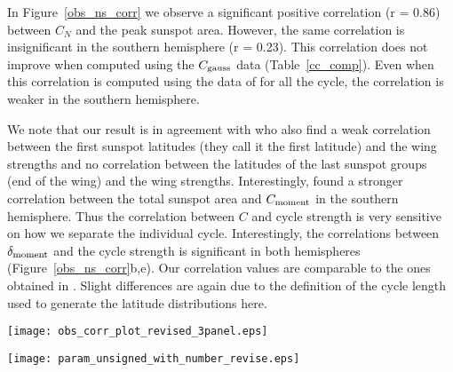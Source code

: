 \documentclass[preprint2,times,tighten]{aastex61}
\newcommand{\Fig}[1]{Figure~\ref{#1}}
\begin{document}
In \Fig{obs_ns_corr} we observe a significant positive correlation (r = 0.86) 
between $C_N$ and the peak sunspot area. However, the same correlation is insignificant 
in the southern hemisphere (r = 0.23). This correlation does not improve when computed using the $C_{\rm{ gauss}}$ data (Table~\ref{cc_comp}).
Even when this correlation is computed using the data of \citet{2017A&A...599A.131L} for all the cycle, the correlation is weaker in the southern hemisphere.

We note that our result is in agreement with \cite{2017A&A...599A.131L} who also find a weak correlation 
between the first sunspot latitudes (they call it the first latitude) and the wing strengths and no correlation between the latitudes of the last sunspot groups (end of the wing) and the wing strengths.
Interestingly, \citet{2008A&A...483..623S} found a stronger correlation between the total sunspot area and $C_{\rm{moment}}$ 
in the southern hemisphere. Thus the correlation between $C$ and cycle strength is very sensitive on how we separate the individual cycle.
Interestingly, the correlations between $\delta_{\rm{moment}}$ and the cycle strength 
is significant in both hemispheres (\Fig{obs_ns_corr}b,e). 
Our correlation values are comparable to the ones obtained in \citet{2008A&A...483..623S}.
Slight differences are again due to the definition of the cycle length used to generate the latitude distributions here.

\begin{figure*}%
\centering
\texttt{[image: obs\_corr\_plot\_revised\_3panel.eps]}
\caption{ Left to right: scatter plots of $C$, $\delta$, and $H$ with the peak sunspot area. 
The top and bottom (green) panels represent the values obtained for the northern and southern 
hemispheres respectively. The linear Pearson correlation coefficients (r) between parameters 
(along with the confidence levels) are printed on each panel.} 
\label{obs_ns_corr}
\end{figure*}

\begin{figure*}%
\centering
\texttt{[image: param\_unsigned\_with\_number\_revise.eps]}
\caption{ Same as \Fig{obs_ns_corr} but distribution parameters are obtained from the unsigned latitudes (full disc) 
and the horizontal axes represent the peak sunspot number. } 
\label{unsigned_corr}
\end{figure*}
\end{document}
